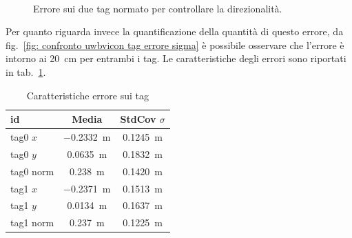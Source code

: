 \begin{figure}[h]
	\centering
	\\
	\caption{Errore sui due tag normato per controllare la direzionalit\`a.}
	\label{fig: confronto uwbvicon tag errore normed}
\end{figure}

Per quanto riguarda invece la quantificazione della quantit\`a di questo errore, da fig.~\ref{fig: confronto uwbvicon tag errore sigma} \`e possibile osservare che l'errore \`e intorno ai \SI{20}{\centi \meter} per entrambi i tag. 
Le caratteristiche degli errori sono riportati in tab.~\ref{tab: Caratteristiche errore sui tag}.
\begin{table}[h]
	\centering
	\begin{tabular}{|l|c|c|}
		\hline
		id   & Media & StdCov $\sigma$ \\ \hline
		tag0 $x$ & 	\SI{-0.2332}{\meter}      	&  \SI{0.1245}{\meter}			\\
		tag0 $y$ & 	\SI{0.0635}{\meter}      	&  \SI{0.1832}{\meter}			\\ 
		tag0 norm & 	\SI{0.238}{\meter}      &  \SI{0.1420}{\meter}			\\
		\hline
		tag1 $x$ & 	\SI{-0.2371}{\meter}      	&  \SI{0.1513}{\meter}			\\
		tag1 $y$ & 	\SI{0.0134}{\meter}      	&  \SI{0.1637}{\meter}			\\
		tag1 norm & \SI{0.237}{\meter}      	&  \SI{0.1225}{\meter} 			\\ \hline
	\end{tabular}
	\caption{Caratteristiche errore sui tag}
	\label{tab: Caratteristiche errore sui tag}
\end{table}

